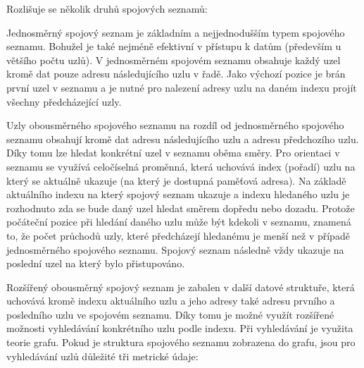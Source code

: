 Rozlišuje se několik druhů spojových seznamů:



Jednosměrný spojový seznam je základním a nejjednodušším typem spojového seznamu. Bohužel je také nejméně efektivní v přístupu k datům (především u většího počtu uzlů). V jednosměrném spojovém seznamu obsahuje každý uzel kromě dat pouze adresu následujícího uzlu v řadě. Jako výchozí pozice je brán první uzel v seznamu a je nutné pro nalezení adresy uzlu na daném indexu projít všechny předcházející uzly.

\vskip 4mm
\centerline{}
\vskip 4mm


Uzly obousměrného spojového seznamu na rozdíl od jednosměrného spojového seznamu obsahují kromě dat adresu následujícího uzlu a adresu předchozího uzlu. Díky tomu lze hledat konkrétní uzel v seznamu oběma směry. Pro orientaci v seznamu se využívá celočíselná proměnná, která uchovává index (pořadí) uzlu na který se aktuálně ukazuje (na který je dostupná paměťová adresa). Na základě aktuálního indexu na který spojový seznam ukazuje a indexu hledaného uzlu je rozhodnuto zda se bude daný uzel hledat směrem dopředu nebo dozadu. Protože počáteční pozice při hledání daného uzlu může být kdekoli v seznamu, znamená to, že počet průchodů uzly, které předcházejí hledanému je menší než v případě jednosměrného spojového seznamu. Spojový seznam následně vždy ukazuje na poslední uzel na který bylo přistupováno. 

\vskip 4mm
\centerline{}
\vskip 4mm


Rozšířený obousměrný spojový seznam je zabalen v další datové struktuře, která uchovává kromě indexu aktuálního uzlu a jeho adresy také adresu prvního a posledního uzlu ve spojovém seznamu. Díky tomu je možné využít rozšířené možnosti vyhledávání konkrétního uzlu podle indexu. Při vyhledávání je využita teorie grafu. Pokud je struktura spojového seznamu zobrazena do grafu, jsou pro vyhledávání uzlů důležité tři metrické údaje:

\vskip 4mm

